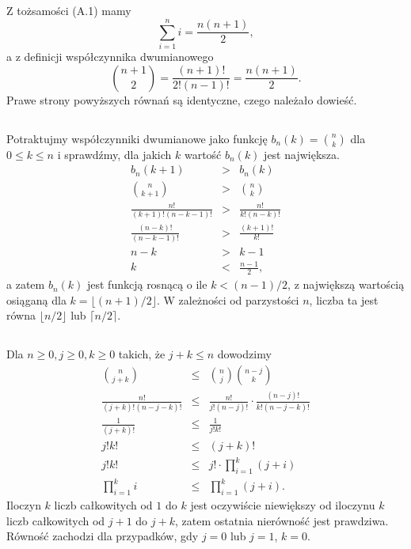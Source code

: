 \subsection{} %
Z tożsamości (A.1) mamy
\[
	\sum_{i=1}^ni = \frac{n(n+1)}{2},
\]
a z definicji współczynnika dwumianowego
\[
	\binom{n+1}{2} = \frac{(n+1)!}{2!(n-1)!} = \frac{n(n+1)}{2}.
\]
Prawe strony powyższych równań są identyczne, czego należało dowieść.

\subsection{} %
Potraktujmy współczynniki dwumianowe jako funkcję $b_n(k)=\binom{n}{k}$ dla $0\le k\le n$ i sprawdźmy, dla jakich $k$ wartość $b_n(k)$ jest największa.
\begin{eqnarray*}
	b_n(k+1) &>& b_n(k) \\
	\binom{n}{k+1} &>& \binom{n}{k} \\
	\frac{n!}{(k+1)!(n-k-1)!} &>& \frac{n!}{k!(n-k)!} \\
	\frac{(n-k)!}{(n-k-1)!} &>& \frac{(k+1)!}{k!} \\
	n-k &>& k-1 \\
	k &<& \frac{n-1}{2},
\end{eqnarray*}
a zatem $b_n(k)$ jest funkcją rosnącą o ile $k<(n-1)/2$, z największą wartością osiąganą dla $k=\lfloor(n+1)/2\rfloor$. W zależności od parzystości $n$, liczba ta jest równa $\lfloor n/2\rfloor$ lub $\lceil n/2\rceil$.

\subsection{} %
Dla $n\ge 0, j\ge 0, k\ge 0$ takich, że $j+k\le n$ dowodzimy
\begin{eqnarray*}
	\binom{n}{j+k} &\le& \binom{n}{j}\binom{n-j}{k} \\
	\frac{n!}{(j+k)!(n-j-k)!} &\le& \frac{n!}{j!(n-j)!}\cdot\frac{(n-j)!}{k!(n-j-k)!} \\
	\frac{1}{(j+k)!} &\le& \frac{1}{j!k!} \\
	j!k! &\le& (j+k)! \\
	j!k! &\le& j!\cdot\prod_{i=1}^k(j+i) \\
	\prod_{i=1}^ki &\le& \prod_{i=1}^k(j+i).
\end{eqnarray*}
Iloczyn $k$ liczb całkowitych od $1$ do $k$ jest oczywiście niewiększy od iloczynu $k$ liczb całkowitych od $j+1$ do $j+k$, zatem ostatnia nierówność jest prawdziwa. Równość zachodzi dla przypadków, gdy $j=0$ lub $j=1$, $k=0$.

